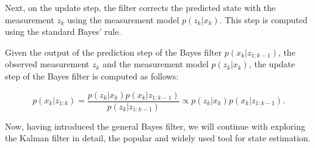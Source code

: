 Next, on the update step, the filter corrects the predicted state with the 
measurement $z_k$ using the measurement model $p(z_k | x_k)$. This step is
computed using the standard Bayes' rule.

\begin{theorem}
    Given the output of the prediction step of the Bayes filter 
    $p\left({x}_k | {z}_{1: k-1}\right)$, the observed measurement $z_k$
    and the measurement model $p(z_k | x_k)$, the update step of the Bayes
    filter is computed as follows:
    
    $$
    p\left({x}_k | {z}_{1: k}\right)=\frac{p\left({z}_k | {x}_k\right) p\left({x}_k | {z}_{1: k-1}\right)}{p\left({z}_k | {z}_{1: k-1}\right)} \propto p\left({z}_k | {x}_k\right) p\left({x}_k | {z}_{1: k-1}\right).
    $$
\end{theorem}

Now, having introduced the general Bayes filter, we will continue with 
exploring the Kalman filter in detail, the popular and widely used tool for 
state estimation.
